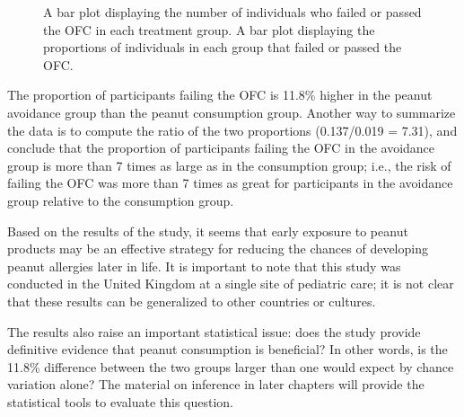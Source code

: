 \begin{figure}[h]
	\centering
	\caption{ A bar plot displaying the number of individuals who failed or passed the OFC in each treatment group.  A bar plot displaying the proportions of individuals in each group that failed or passed the OFC.}
	\label{leapBarPlots}
\end{figure}

The proportion of participants failing the OFC is 11.8\% higher in the peanut avoidance group than the peanut consumption group. Another way to summarize the data is to compute the ratio of the two proportions (0.137/0.019 = 7.31), and conclude that the proportion of participants failing the OFC in the avoidance group is more than 7 times as large as in the consumption group; i.e., the risk of failing the OFC was more than 7 times as great for participants in the avoidance group relative to the consumption group.

Based on the results of the study, it seems that early exposure to peanut products may be an effective strategy for reducing the chances of developing peanut allergies later in life. It is important to note that this study was conducted in the United Kingdom at a single site of pediatric care; it is not clear that these results can be generalized to other countries or cultures.

The results also raise an important statistical issue: does the study provide definitive evidence that peanut consumption is beneficial? In other words, is the 11.8\% difference between the two groups larger than one would expect by chance variation alone? The material on inference in later chapters will provide the statistical tools to evaluate this question.


